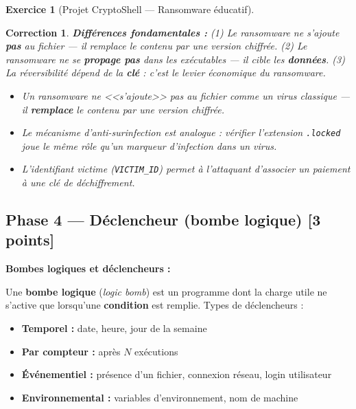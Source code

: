 \documentclass[a4paper,11pt]{article}
\theoremstyle{plain}
\newtheorem{correction}{Correction}
\theoremstyle{definition}
\newtheorem{exercice}{Exercice}
\begin{document}
\begin{exercice}[Projet CryptoShell --- Ransomware éducatif]
\begin{correction}
\textbf{Différences fondamentales :} (1) Le ransomware ne s'ajoute \textbf{pas} au fichier --- il remplace le contenu par une version chiffrée. (2) Le ransomware ne se \textbf{propage pas} dans les exécutables --- il cible les \textbf{données}. (3) La réversibilité dépend de la \textbf{clé} : c'est le levier économique du ransomware.

\begin{pointcle}
\begin{itemize}
    \item Un ransomware ne <<s'ajoute>> pas au fichier comme un virus classique --- il \textbf{remplace} le contenu par une version chiffrée.
    \item Le mécanisme d'anti-surinfection est analogue : vérifier l'extension \texttt{.locked} joue le même rôle qu'un marqueur d'infection dans un virus.
    \item L'identifiant victime (\texttt{VICTIM\_ID}) permet à l'attaquant d'associer un paiement à une clé de déchiffrement.
\end{itemize}
\end{pointcle}

\end{correction}



\subsection*{Phase 4 --- Déclencheur (bombe logique) \hfill \normalsize [3 points]}

\begin{rappel}
\textbf{Bombes logiques et déclencheurs :}

Une \textbf{bombe logique} (\textit{logic bomb}) est un programme dont la charge utile ne s'active que lorsqu'une \textbf{condition} est remplie. Types de déclencheurs :
\begin{itemize}
    \item \textbf{Temporel :} date, heure, jour de la semaine
    \item \textbf{Par compteur :} après $N$ exécutions
    \item \textbf{Événementiel :} présence d'un fichier, connexion réseau, login utilisateur
    \item \textbf{Environnemental :} variables d'environnement, nom de machine
\end{itemize}


\end{rappel}
\end{exercice}
\end{document}
